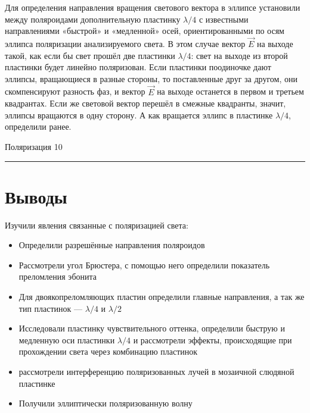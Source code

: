 \documentclass[12pt,a4paper]{scrartcl}
\begin{document}
	Для определения направления вращения светового вектора в эллипсе 	установили между поляроидами дополнительную пластинку $\lambda/4$ с известными направлениями «быстрой» и «медленной» осей, ориентированными по осям эллипса поляризации анализируемого света. В этом случае вектор $\vec{E}$ на выходе такой, как если бы свет прошёл две пластинки $\lambda/4$: свет на выходе из второй пластинки будет линейно поляризован. Если пластинки поодиночке дают эллипсы, вращающиеся в разные стороны, то поставленные друг за другом, они скомпенсируют разность фаз, и вектор $\vec{E}$ на выходе останется в первом и третьем квадрантах. Если же световой вектор перешёл в смежные квадранты, значит, эллипсы вращаются в одну сторону. А как вращается эллипс в пластинке $\lambda/4$, определили ранее.
	
	\newpage
	
	
	\begin{flushleft}
		\footnotesize{Поляризация} \hspace{\fill} \footnotesize{10}
		\\[-0.3cm]\noindent\rule{\textwidth}{0.3pt}
	\end{flushleft}
	
	\section{Выводы}
	
	Изучили явления связанные с поляризацией света:
	
	\begin{itemize}
		\item Определили разрешённые направления поляроидов
		\item Рассмотрели угол Брюстера, с помощью него определили показатель преломления эбонита
		\item Для двоякопреломляющих пластин определили главные направления, а так же тип пластинок --- $\lambda /4$ и $\lambda/2$
		\item Исследовали пластинку чувствительного оттенка, определили быструю и медленную оси пластинки $\lambda/4$ и рассмотрели эффекты, происходящие при прохождении света через комбинацию пластинок
		\item рассмотрели интерференцию поляризованных лучей в мозаичной слюдяной пластинке
		\item Получили эллиптически поляризованную волну
	\end{itemize}
	
\end{document}
